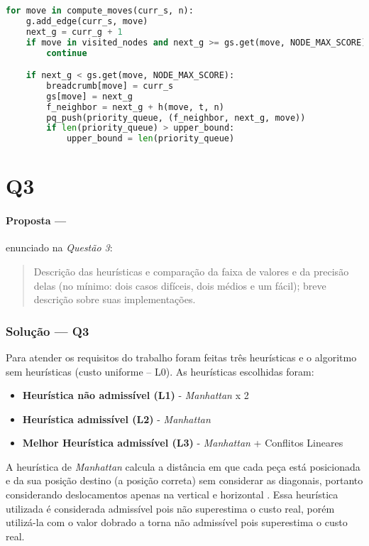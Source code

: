 \documentclass[12pt]{article}
\begin{document}
\begin{lstlisting}[language=Python]
for move in compute_moves(curr_s, n):
    g.add_edge(curr_s, move)
    next_g = curr_g + 1
    if move in visited_nodes and next_g >= gs.get(move, NODE_MAX_SCORE):
        continue

    if next_g < gs.get(move, NODE_MAX_SCORE):
        breadcrumb[move] = curr_s
        gs[move] = next_g
        f_neighbor = next_g + h(move, t, n)
        pq_push(priority_queue, (f_neighbor, next_g, move))
        if len(priority_queue) > upper_bound:
            upper_bound = len(priority_queue)
\end{lstlisting}

\newpage

\section{Q3}

\paragraph{Proposta ---} enunciado na \textit{Questão 3}:

\begin{quote}
Descrição das heurísticas e comparação da faixa de valores e da precisão delas (no mínimo: dois casos difíceis, dois médios e um fácil); breve descrição sobre suas implementações.
\end{quote}

\subsubsection{Solução --- \textbf{Q3}}

Para atender os requisitos do trabalho foram feitas três heurísticas e o algoritmo sem heurísticas (custo uniforme – L0). As heurísticas escolhidas foram:

\begin{itemize}
    \item \textbf{Heurística não admissível (L1)} - \textit{Manhattan} x 2
    \item \textbf{Heurística admissível (L2)} - \textit{Manhattan}
    \item \textbf{Melhor Heurística admissível (L3)} - \textit{Manhattan} + Conflitos Lineares
\end{itemize}

A heurística de \textit{Manhattan} calcula a distância em que cada peça está posicionada e da sua posição destino (a posição correta) sem considerar as diagonais, portanto considerando deslocamentos apenas na vertical e horizontal \cite{sharma2016}. Essa heurística utilizada é considerada admissível pois não superestima o custo real, porém utilizá-la com o valor dobrado a torna não admissível pois superestima o custo real.
\end{document}
